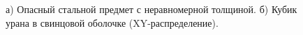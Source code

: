 \documentclass[a4paper]{panl}
\begin{document}
\begin{figure}[t]
    \begin{center}
        \begin{minipage}[h]{0.49\linewidth}
        \end{minipage}
        \hfill
        \begin{minipage}[h]{0.49\linewidth}
        \end{minipage}         
        \vspace{-3mm}
        \caption{а) Опасный стальной предмет с неравномерной толщиной. б) Кубик урана в свинцовой оболочке (XY-распределение).}
    \end{center}
    \vspace{-5mm}
\end{figure}
\end{document}

